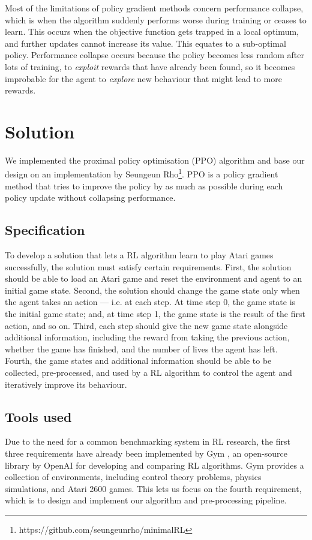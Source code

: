 \documentclass[12pt,a4paper]{article}
\begin{document}
Most of the limitations of policy gradient methods concern performance collapse, which is when the algorithm suddenly performs worse during training or ceases to learn. This occurs when the objective function gets trapped in a local optimum, and further updates cannot increase its value. This equates to a sub-optimal policy. Performance collapse occurs because the policy becomes less random after lots of training, to \emph{exploit} rewards that have already been found, so it becomes improbable for the agent to \emph{explore} new behaviour that might lead to more rewards.

\section{Solution}
We implemented the proximal policy optimisation (PPO) algorithm \cite{DBLP:journals/corr/SchulmanWDRK17} and base our design on an implementation by Seungeun Rho\footnote{https://github.com/seungeunrho/minimalRL}. PPO is a policy gradient method that tries to improve the policy by as much as possible during each policy update without collapsing performance. 

\subsection{Specification}
To develop a solution that lets a RL algorithm learn to play Atari games successfully, the solution must satisfy certain requirements. First, the solution should be able to load an Atari game and reset the environment and agent to an initial game state. Second, the solution should change the game state only when the agent takes an action --- i.e. at each step. At time step 0, the game state is the initial game state; and, at time step 1, the game state is the result of the first action, and so on. Third, each step should give the new game state alongside additional information, including the reward from taking the previous action, whether the game has finished, and the number of lives the agent has left. Fourth, the game states and additional information should be able to be collected, pre-processed, and used by a RL algorithm to control the agent and iteratively improve its behaviour.

\subsection{Tools used}
Due to the need for a common benchmarking system in RL research, the first three requirements have already been implemented by Gym \cite{1606.01540}, an open-source library by OpenAI for developing and comparing RL algorithms. Gym provides a collection of environments, including control theory problems, physics simulations, and Atari 2600 games. This lets us focus on the fourth requirement, which is to design and implement our algorithm and pre-processing pipeline.
\end{document}
